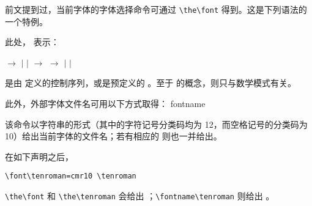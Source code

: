 \documentclass{book}
\begin{document}
前文提到过，当前字体的字体选择命令可通过 \verb.\the\font. 得到。这是下列语法的一个特例。
\begin{Disp}\end{Disp}
此处， 表示：
\begin{disp}
 $\longrightarrow$  $|$  $|$ \nl
{} $\longrightarrow$ \nl
{} $\longrightarrow$  $|$  $|$ 
\end{disp}
 是由  定义的控制序列，或是预定义的 。至于  的概念，则只与数学模式有关。

此外，外部字体文件名可用以下方式取得：
\cstoidx fontname\par
\begin{Disp}\end{Disp}
该命令以字符串的形式（其中的字符记号分类码均为 12，而空格记号的分类码为 10）给出当前字体的文件名；若有相应的  则也一并给出。

\begin{example}
在如下声明之后，
\begin{verbatim}
\font\tenroman=cmr10 \tenroman
\end{verbatim}
\verb.\the\font. 和 \verb.\the\tenroman. 会给出 ；\verb.\fontname\tenroman. 则给出 。
\end{example}

\end{document}
